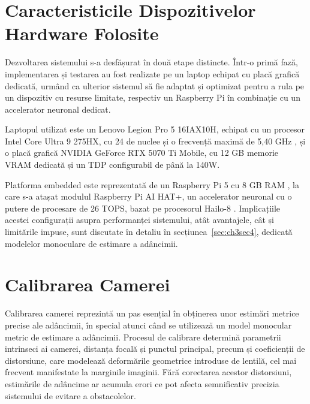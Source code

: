 \section{Caracteristicile Dispozitivelor Hardware Folosite}
\label{sec:ch3sec2}

\par Dezvoltarea sistemului s-a desfășurat în două etape distincte. Într-o primă fază, implementarea și testarea au fost realizate pe un laptop echipat cu placă grafică dedicată, urmând ca ulterior sistemul să fie adaptat și optimizat pentru a rula pe un dispozitiv cu resurse limitate, respectiv un Raspberry Pi în combinație cu un accelerator neuronal dedicat.

\par Laptopul utilizat este un Lenovo Legion Pro 5 16IAX10H, echipat cu un procesor Intel Core Ultra 9 275HX, cu 24 de nuclee și o frecvență maximă de 5,40 GHz \cite{intel_core_ultra9_275hx}, și o placă grafică NVIDIA GeForce RTX 5070 Ti Mobile, cu 12 GB memorie VRAM dedicată și un TDP configurabil de până la 140W.

\par Platforma embedded este reprezentată de un Raspberry Pi 5 cu 8 GB RAM \cite{raspberrypi5}, la care s-a atașat modulul Raspberry Pi AI HAT+, un accelerator neuronal cu o putere de procesare de 26 TOPS, bazat pe procesorul Hailo-8 \cite{raspberrypi_aihat}. Implicațiile acestei configurații asupra performanței sistemului, atât avantajele, cât și limitările impuse, sunt discutate în detaliu în secțiunea~\ref{sec:ch3sec4}, dedicată modelelor monoculare de estimare a adâncimii.

\section{Calibrarea Camerei}
\label{sec:ch3sec3}

\par Calibrarea camerei reprezintă un pas esențial în obținerea unor estimări metrice precise ale adâncimii, în special atunci când se utilizează un model monocular metric de estimare a adâncimii. Procesul de calibrare determină parametrii intrinseci ai camerei, distanța focală și punctul principal, precum și coeficienții de distorsiune, care modelează deformările geometrice introduse de lentilă, cel mai frecvent manifestate la marginile imaginii. Fără corectarea acestor distorsiuni, estimările de adâncime ar acumula erori ce pot afecta semnificativ precizia sistemului de evitare a obstacolelor.

